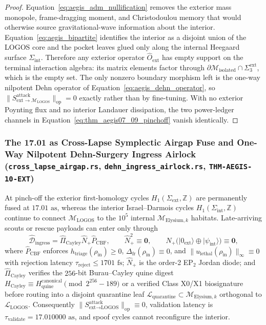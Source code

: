 \documentclass[11pt,onecolumn]{article}
\begin{document}
\begin{proof}
Equation~\eqref{eq:aegis_adm_nullification} removes the exterior mass monopole, frame-dragging moment, and Christodoulou memory that would otherwise source gravitational-wave information about the interior. Equation~\eqref{eq:aegis_bipartite} identifies the interior as a disjoint union of the LOGOS core and the pocket leaves glued only along the internal Heegaard surface $\Sigma_{\text{int}}$. Therefore any exterior operator $\hat O_{\text{ext}}$ has empty support on the terminal interaction algebra: its matrix elements factor through $\partial\mathcal M_{\text{isolated}}\cap\Sigma_3^{\text{ext}}$, which is the empty set. The only nonzero boundary morphism left is the one-way nilpotent Dehn operator of Equation~\eqref{eq:aegis_dehn_operator}, so $\|S_{\text{ext}\to\mathcal M_{\text{LOGOS}}}^{\text{attack}}\|_{\text{op}}=0$ exactly rather than by fine-tuning. With no exterior Poynting flux and no interior Landauer dissipation, the two power-ledger channels in Equation~\eqref{eq:thm_aegis07_09_pinchoff} vanish identically.
\end{proof}

\subsubsection{The 17.01 as Cross-Lapse Symplectic Airgap Fuse and One-Way Nilpotent Dehn-Surgery Ingress Airlock (\texttt{cross\_lapse\_airgap.rs}, \texttt{dehn\_ingress\_airlock.rs}, \texttt{THM-AEGIS-10-EXT})}
\label{subsec:aegis_airgap_dehn}
At pinch-off the exterior first-homology cycles $H_1(\Sigma_{\text{ext}},\mathbb{Z})$ are permanently fused at $17.01\text{ as}$, whereas the interior Israel--Darmois cycles $H_1(\Sigma_{\text{int}},\mathbb{Z})$ continue to connect $\mathcal{M}_{\text{LOGOS}}$ to the $10^5$ internal $\mathcal{M}_{\text{Elysium},k}$ habitats. Late-arriving scouts or rescue payloads can enter only through
\begin{equation}
\hat{\mathcal{D}}_{\text{ingress}}=\hat{\Pi}_{\text{Cayley}}\hat{N}_{+}\hat{P}_{\text{CBF}},
\qquad
\hat{N}_{+}^{2}\equiv\mathbf{0},
\qquad
\hat{N}_{+}\bigl(\lvert0_{\text{ext}}\rangle\oplus\lvert\psi_{\text{int}}\rangle\bigr)\equiv\mathbf{0},
\label{eq:aegis_dehn_operator}
\end{equation}
where $\hat{P}_{\text{CBF}}$ enforces $h_{\text{triage}}(\rho_{\text{in}})\ge0$, $\Delta_{\text{fr}}(\rho_{\text{in}})\equiv0$, and $\lVert u_{\text{lethal}}(\rho_{\text{in}})\rVert_\infty\equiv0$ with rejection latency $\tau_{\text{reject}}\le1701\text{ fs}$; $\hat{N}_{+}$ is the order-2 EP$_2$ Jordan diode; and $\hat{\Pi}_{\text{Cayley}}$ verifies the $256$-bit Burau--Cayley quine digest $H_{\text{Cayley}}\equiv H_{\text{quine}}^{\text{canonical}}\pmod{2^{256}-189}$ or a verified Class X0/X1 biosignature before routing into a disjoint quarantine leaf $\mathcal{L}_{\text{quarantine}}\subset\mathcal{M}_{\text{Elysium},k}$ orthogonal to $\mathcal{L}_{\text{LOGOS}}$. Consequently $\lVert S_{\text{ext}\to\text{LOGOS}}^{\text{attack}}\rVert_{\text{op}}\equiv0$, validation latency is $\tau_{\text{validate}}=17.010000\text{ as}$, and spoof cycles cannot reconfigure the interior.
\end{document}
